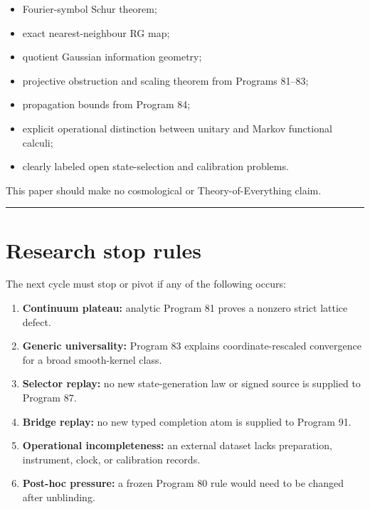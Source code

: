 \documentclass[11pt,a4paper,openany]{report}
\begin{document}
\begin{itemize}
\item 
Fourier-symbol Schur theorem;

\item 
exact nearest-neighbour RG map;

\item 
quotient Gaussian information geometry;

\item 
projective obstruction and scaling theorem from Programs 81--83;

\item 
propagation bounds from Program 84;

\item 
explicit operational distinction between unitary and Markov functional calculi;

\item 
clearly labeled open state-selection and calibration problems.

\end{itemize}

This paper should make no cosmological or Theory-of-Everything claim.

\par\medskip\hrule\medskip

\chapter{Research stop rules}

The next cycle must stop or pivot if any of the following occurs:

\begin{enumerate}
\item 
\textbf{Continuum plateau:} analytic Program 81 proves a nonzero strict lattice defect.

\item 
\textbf{Generic universality:} Program 83 explains coordinate-rescaled convergence for a broad smooth-kernel class.

\item 
\textbf{Selector replay:} no new state-generation law or signed source is supplied to Program 87.

\item 
\textbf{Bridge replay:} no new typed completion atom is supplied to Program 91.

\item 
\textbf{Operational incompleteness:} an external dataset lacks preparation, instrument, clock, or calibration records.

\item 
\textbf{Post-hoc pressure:} a frozen Program 80 rule would need to be changed after unblinding.

\end{enumerate}
\end{document}
